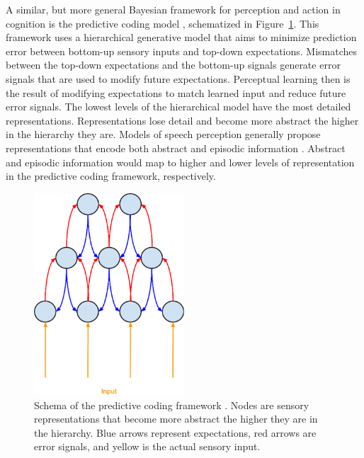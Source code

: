 A similar, but more general Bayesian framework for perception and action in cognition is the predictive coding model \citep{Clark2013}, schematized in Figure~\ref{fig:predictivecoding}.
This framework uses a hierarchical generative model that aims to minimize prediction error between bottom-up sensory inputs and top-down expectations.  
Mismatches between the top-down expectations and the bottom-up signals generate error signals that are used to modify future expectations.  
Perceptual learning then is the result of modifying expectations to match learned input and reduce future error signals.
The lowest levels of the hierarchical model have the most detailed representations.
Representations lose detail and become more abstract the higher in the hierarchy they are.
Models of speech perception generally propose representations that encode both abstract and episodic information \citep[e.g.][]{McLennan2003}.
Abstract and episodic information would map to higher and lower levels of representation in the predictive coding framework, respectively.

\begin{figure}[!ht]
\caption{Schema of the predictive coding framework \citep{Clark2013}.  Nodes are sensory representations that become more abstract the higher they are in the hierarchy. Blue arrows represent expectations, red arrows are error signals, and yellow is the actual sensory input.}
\label{fig:predictivecoding}
\begin{center}
\includegraphics[width=0.5\textwidth]{pictures/predictive_coding}
\end{center}
\end{figure}

